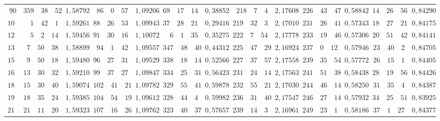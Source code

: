 \begin{landscape}
\begin{center}
\begin{tabular}{r|r|r|r|r|r|r|r|r|r|r|r|r}
\(90\) & \(359\quad 38\quad 52\) & \(1{,}58792\) & \(86\quad 0\quad 57\) & \(1{,}09206\) & \(69\quad 17\quad 14\) & \(0{,}38852\) & \(218\quad 7\quad 4\) & \(2{,}17608\) & \(226\quad 43\quad 47\) & \(0{,}58842\) & \(14\quad 26\quad 56\) & \(0{,}84290\) \\
\(105\) & \(1\quad 42\quad 1\) & \(1{,}59261\) & \(88\quad 26\quad 53\) & \(1{,}09943\) & \(37\quad 28\quad 21\) & \(0{,}29416\) & \(219\quad 32\quad 3\) & \(2{,}17010\) & \(231\quad 26\quad 41\) & \(0{,}57343\) & \(18\quad 27\quad 21\) & \(0{,}84175\) \\[3pt]
\(120\) & \(5\quad 2\quad 14\) & \(1{,}59456\) & \(91\quad 30\quad 16\) & \(1{,}10072\) & \(6\quad 1\quad 35\) & \(0{,}35275\) & \(222\quad 7\quad 54\) & \(2{,}17778\) & \(233\quad 19\quad 46\) & \(0{,}57306\) & \(20\quad 51\quad 42\) & \(0{,}84141\) \\
\(135\) & \(7\quad 50\quad 38\) & \(1{,}58899\) & \(94\quad 1\quad 42\) & \(1{,}09557\) & \(347\quad 48\quad 40\) & \(0{,}44312\) & \(225\quad 47\quad 29\) & \(2{,}16924\) & \(237\quad 0\quad 12\) & \(0{,}57946\) & \(23\quad 40\quad 2\) & \(0{,}84705\) \\
\(150\) & \(9\quad 50\quad 18\) & \(1{,}59480\) & \(96\quad 27\quad 31\) & \(1{,}09529\) & \(338\quad 18\quad 14\) & \(0{,}52566\) & \(227\quad 37\quad 57\) & \(2{,}17558\) & \(239\quad 35\quad 54\) & \(0{,}57772\) & \(26\quad 15\quad 1\) & \(0{,}84405\) \\
\(165\) & \(13\quad 30\quad 32\) & \(1{,}59210\) & \(99\quad 37\quad 27\) & \(1{,}09847\) & \(334\quad 25\quad 31\) & \(0{,}56423\) & \(231\quad 24\quad 14\) & \(2{,}17563\) & \(241\quad 51\quad 38\) & \(0{,}58438\) & \(28\quad 19\quad 56\) & \(0{,}84426\) \\[3pt]
\(180\) & \(15\quad 30\quad 40\) & \(1{,}59074\) & \(102\quad 41\quad 21\) & \(1{,}09782\) & \(329\quad 55\quad 41\) & \(0{,}59878\) & \(232\quad 55\quad 21\) & \(2{,}17030\) & \(244\quad 46\quad 14\) & \(0{,}58250\) & \(31\quad 35\quad 4\) & \(0{,}84387\) \\
\(195\) & \(18\quad 35\quad 24\) & \(1{,}59385\) & \(104\quad 54\quad 19\) & \(1{,}09612\) & \(328\quad 44\quad 4\) & \(0{,}59982\) & \(236\quad 31\quad 40\) & \(2{,}17547\) & \(246\quad 27\quad 14\) & \(0{,}57932\) & \(34\quad 25\quad 51\) & \(0{,}83925\) \\
\(210\) & \(21\quad 11\quad 20\) & \(1{,}59323\) & \(107\quad 16\quad 26\) & \(1{,}09762\) & \(323\quad 40\quad 37\) & \(0{,}57657\) & \(239\quad 14\quad 3\) & \(2{,}16961\) & \(249\quad 23\quad 1\) & \(0{,}58186\) & \(37\quad 1\quad 27\) & \(0{,}84377\) \\

\end{tabular}
\end{center}
\end{landscape}
